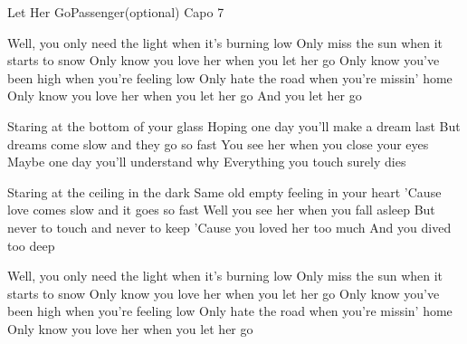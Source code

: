 \begin{song}{Let Her Go}{Passenger}{(optional) Capo 7}

Well, you only need the light when it's burning low
Only miss the sun when it starts to snow
Only know you love her when you let her go
Only know you've been high when you're feeling low
Only hate the road when you're missin' home
Only know you love her when you let her go
  And you let her go


Staring at the bottom of your glass
Hoping one day you'll make a dream last
But dreams come slow and they go so fast
You see her when you close your eyes
Maybe one day you'll understand why
Everything you touch surely dies


Staring at the ceiling in the dark
Same old empty feeling in your heart
'Cause love comes slow and it goes so fast
Well you see her when you fall asleep
But never to touch and never to keep
'Cause you loved her too much
And you dived too deep

Well, you only need the light when it's burning low
Only miss the sun when it starts to snow
Only know you love her when you let her go
Only know you've been high when you're feeling low
Only hate the road when you're missin' home
Only know you love her when you let her go


\end{song}
